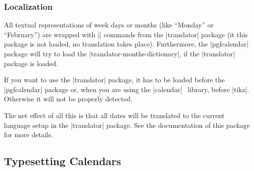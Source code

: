 \subsubsection{Localization}
\label{section-calendar-locale}

All textual representations of week days or months (like ``Monday'' or
``February'') are wrapped with |\translate| commands from the |translator|
package (it this package is not loaded, no translation takes place).
Furthermore, the |pgfcalendar| package will try to load the
|translator-months-dictionary|, if the |translator| package is loaded.

If you want to use the |translator| package, it has to be loaded before the
|pgfcalendar| package or, when you are using the |calendar| \tikzname\ library,
before |tikz|.  Otherwise it will not be properly detected.

The net effect of all this is that all dates will be translated to the current
language setup in the |translator| package. See the documentation of this
package for more details.


\subsection{Typesetting Calendars}

